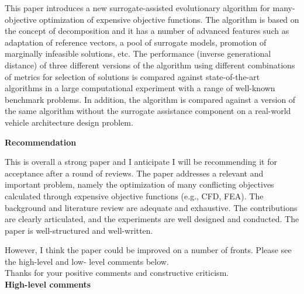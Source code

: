 \documentclass[onecolumn,10pt]{asme2ej}
\begin{document}
This paper introduces a new surrogate-assisted evolutionary algorithm for many-objective optimization of expensive objective functions. The algorithm is based on the concept of decomposition and it has a number of advanced features such as adaptation of reference vectors, a pool of surrogate models, promotion of marginally infeasible solutions, etc. The performance (inverse generational distance) of three different versions of the algorithm using different combinations of metrics for selection of solutions is compared against state-of-the-art algorithms in a large computational experiment with a range of well-known benchmark problems. In addition, the algorithm is compared against a version of the same algorithm without the surrogate assistance component on a real-world vehicle architecture design problem.

\textbf{Recommendation}

This is overall a strong paper and I anticipate I will be recommending it for acceptance after a round of reviews. The paper addresses a relevant and important problem, namely the optimization of many conflicting objectives calculated through expensive objective functions (e.g., CFD, FEA). The background and literature review are adequate and exhaustive. The contributions are clearly articulated, and the experiments are well designed and conducted. The paper is well-structured and well-written.

However, I think the paper could be improved on a number of fronts. Please see the high-level and low- level comments below. \\

{\color{blue} Thanks for your positive comments and constructive criticism. } \\

\textbf{High-level comments}
\end{document}
